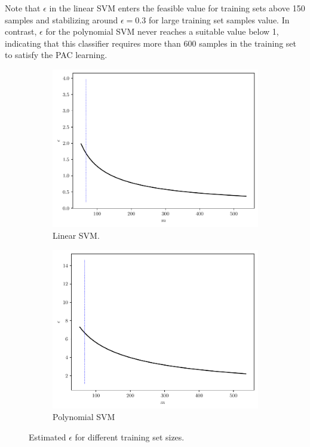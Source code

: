 \documentclass[conference]{IEEEtran}
\theoremstyle{definition}
\theoremstyle{remark}
\theoremstyle{remark}
\begin{document}
Note that $\epsilon$ in the linear SVM enters the feasible value for training
sets above 150 samples and stabilizing around $\epsilon=0.3$ for large training
set samples value. In contrast, $\epsilon$ for the polynomial SVM never reaches
a suitable value below 1, indicating that this classifier requires more than 600
samples in the training set to satisfy the PAC learning.

\begin{figure}
  \centering
  \begin{subfigure}[b]{0.45\textwidth}
    \centering \includegraphics[width=\textwidth]{figs/svm-linear-error.pdf}
    \caption{Linear SVM.}
  \end{subfigure}
  \begin{subfigure}[b]{0.45\textwidth}
    \centering \includegraphics[width=\textwidth]{figs/svm-poly-error.pdf}
    \caption{Polynomial SVM}
  \end{subfigure}
  \caption{Estimated $\epsilon$ for different training set sizes.}
  \label{fig:error-SVM}
\end{figure}
\end{document}
